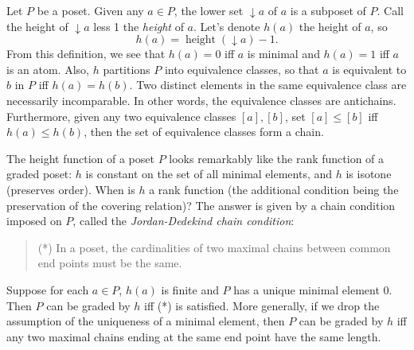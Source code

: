 \documentclass[12pt]{article}
\newcommand{\down}{\downarrow\!\!}
\begin{document}
Let $P$ be a poset.  Given any $a\in P$, the lower set $\down a$ of $a$ is a subposet of $P$.  Call the height of $\down a$ less 1 the \emph{height} of $a$.  Let's denote $h(a)$ the height of $a$, so $$h(a)=\operatorname{height}(\down a)-1.$$  From this definition, we see that $h(a)=0$ iff $a$ is minimal and $h(a)=1$ iff $a$ is an atom.  Also, $h$ partitions $P$ into equivalence classes, so that $a$ is equivalent to $b$ in $P$ iff $h(a)=h(b)$.  Two distinct elements in the same equivalence class are necessarily incomparable.  In other words, the equivalence classes are antichains.  Furthermore, given any two equivalence classes $[a],[b]$, set $[a]\le[b]$ iff $h(a)\le h(b)$, then the set of equivalence classes form a chain.

The height function of a poset $P$ looks remarkably like the rank function of a graded poset: $h$ is constant on the set of all minimal elements, and $h$ is isotone (preserves order).  When is $h$ a rank function (the additional condition being the preservation of the covering relation)?  The answer is given by a chain condition imposed on $P$, called the \emph{Jordan-Dedekind chain condition}:
\begin{quote}
(*) In a poset, the cardinalities of two maximal chains between common end points must be the same.
\end{quote}
Suppose for each $a\in P$, $h(a)$ is finite and $P$ has a unique minimal element $0$.  Then $P$ can be graded by $h$ iff (*) is satisfied.  More generally, if we drop the assumption of the uniqueness of a minimal element, then $P$ can be graded by $h$ iff any two maximal chains ending at the same end point have the same length.

\end{document}
